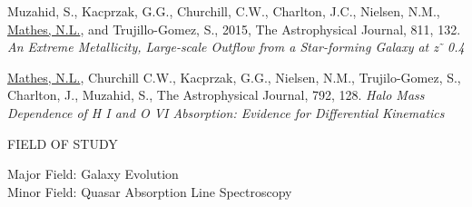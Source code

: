 \hangindent=0.5in \noindent Muzahid, S., Kacprzak, G.G., Churchill, C.W., Charlton, J.C., Nielsen, N.M., \underline{Mathes, N.L.}, and Trujillo-Gomez, S., 2015, The Astrophysical Journal, 811, 132. \textit{An Extreme Metallicity, Large-scale Outflow from a Star-forming Galaxy at z  ̃ 0.4}

\hangindent=0.5in \noindent \underline{Mathes, N.L.}, Churchill C.W., Kacprzak, G.G., Nielsen, N.M., Trujilo-Gomez, S., Charlton, J., Muzahid, S., The Astrophysical Journal, 792, 128. \textit{Halo Mass Dependence of H I and O VI Absorption: Evidence for Differential Kinematics}



\medskip

\begin{center}
FIELD OF STUDY
\end{center}
\begin{flushleft}
Major Field: Galaxy Evolution\\
Minor Field: Quasar Absorption Line Spectroscopy
\end{flushleft}
